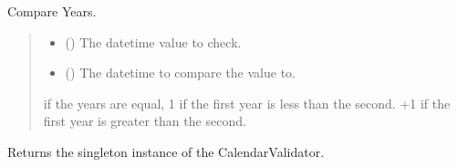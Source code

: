 \documentclass[letterpaper,10pt,english]{sphinxmanual}
\begin{document}
\begin{fulllineitems}
\begin{fulllineitems}
\label{\detokenize{apache_commons_validator_python.routines:apache_commons_validator_python.routines.calendar_validator.CalendarValidator.compare_years}}
\pysigstartsignatures
{}
\pysigstopsignatures
\sphinxAtStartPar
Compare Years.
\begin{quote}\begin{description}
\begin{itemize}
\item {} 
\sphinxAtStartPar
{} () \textendash{} The datetime value to check.

\item {} 
\sphinxAtStartPar
{} () \textendash{} The datetime to compare the value to.

\end{itemize}

 if the years are equal,
\sphinxhyphen{}1 if the first year is less than the second.
+1 if the first year is greater than the second.

\end{description}\end{quote}

\end{fulllineitems}


\begin{fulllineitems}
\label{\detokenize{apache_commons_validator_python.routines:apache_commons_validator_python.routines.calendar_validator.CalendarValidator.get_instance}}
\pysigstartsignatures
{}
\pysigstopsignatures
\sphinxAtStartPar
Returns the singleton instance of the CalendarValidator.


\end{fulllineitems}
\end{fulllineitems}
\end{document}
